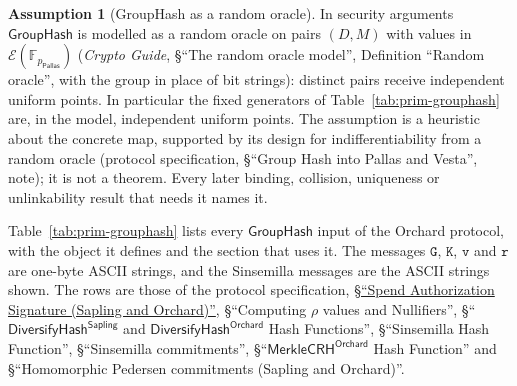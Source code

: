 \documentclass[11pt,a4paper]{article}
\theoremstyle{definition}
\newtheorem{assumption}[theorem]{Assumption}
\newcommand{\F}{\mathbb{F}}
\newcommand{\Pallas}{\ensuremath{\mathsf{Pallas}}}
\newcommand{\Ep}{\ensuremath{\mathcal{E}}}
\newcommand{\GroupHash}{\ensuremath{\mathsf{GroupHash}}}
\begin{document}
\begin{assumption}[GroupHash as a random oracle]\label{ass:grouphash-ro}
In security arguments $\GroupHash$ is modelled as a random oracle on pairs
$(D, M)$ with values in $\Ep(\F_{p_{\Pallas}})$ (\emph{Crypto Guide},
\S``The random oracle model'', Definition ``Random oracle'', with the group
in place of bit strings): distinct pairs receive independent uniform points.
In particular the fixed generators of Table~\ref{tab:prim-grouphash} are, in
the model, independent uniform points. The assumption is a
heuristic about the concrete map, supported by its design for
indifferentiability from a random oracle (protocol specification,
\S``Group Hash into Pallas and Vesta'', note); it is not a theorem. Every
later binding, collision, uniqueness or unlinkability result that needs it
names it.
\end{assumption}

Table~\ref{tab:prim-grouphash} lists every $\GroupHash$ input of the Orchard
protocol, with the object it defines and the section that uses it. The
messages $\texttt{G}$, $\texttt{K}$, $\texttt{v}$ and $\texttt{r}$ are
one-byte ASCII strings, and the Sinsemilla messages are the ASCII strings
shown. The rows are those of the protocol specification,
\href{https://zips.z.cash/protocol/protocol.pdf#concretespendauthsig}%
{\S``Spend Authorization Signature (Sapling and Orchard)''},
\S``Computing $\rho$ values and Nullifiers'',
\S``$\mathsf{DiversifyHash}^{\mathsf{Sapling}}$ and
$\mathsf{DiversifyHash}^{\mathsf{Orchard}}$ Hash Functions'',
\S``Sinsemilla Hash Function'', \S``Sinsemilla commitments'',
\S``$\mathsf{MerkleCRH}^{\mathsf{Orchard}}$ Hash Function'' and
\S``Homomorphic Pedersen commitments (Sapling and Orchard)''.
\end{document}

